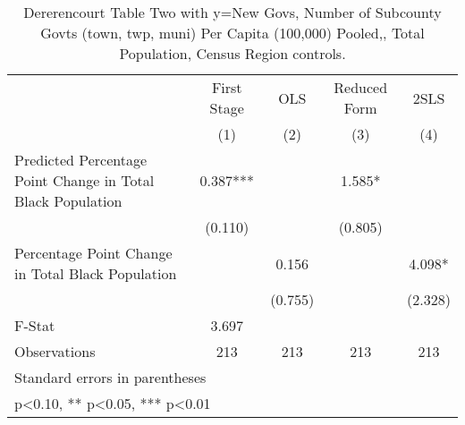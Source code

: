 \begin{table}[htbp]\centering
\def\sym#1{\ifmmode^{#1}\else\(^{#1}\)\fi}
\caption{Dererencourt Table Two with y=New Govs, Number of Subcounty Govts (town, twp, muni) Per Capita (100,000) Pooled,, Total Population, Census Region controls.}
\begin{tabular}{l*{4}{c}}
\toprule
                    & First Stage   &         OLS   &Reduced Form   &        2SLS   \\
                    &\multicolumn{1}{c}{(1)}   &\multicolumn{1}{c}{(2)}   &\multicolumn{1}{c}{(3)}   &\multicolumn{1}{c}{(4)}   \\
\midrule
Predicted Percentage Point Change in Total Black Population&       0.387***&               &       1.585*  &               \\
                    &     (0.110)   &               &     (0.805)   &               \\
\addlinespace
Percentage Point Change in Total Black Population&               &       0.156   &               &       4.098*  \\
                    &               &     (0.755)   &               &     (2.328)   \\
\midrule
F-Stat              &       3.697   &               &               &               \\
Observations        &         213   &         213   &         213   &         213   \\
\bottomrule
\multicolumn{5}{l}{\footnotesize Standard errors in parentheses}\\
\multicolumn{5}{l}{\footnotesize * p<0.10, ** p<0.05, *** p<0.01}\\
\end{tabular}
\end{table}
